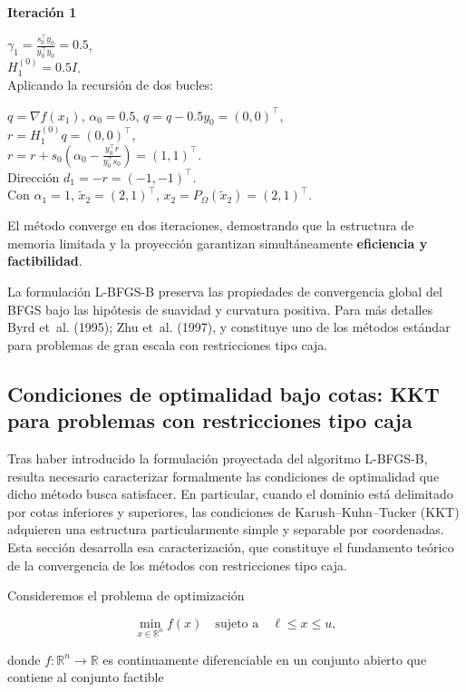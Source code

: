 \documentclass[
  spanish,
  us-letterpaper,
  DIV=11,
  numbers=noendperiod]{scrreprt}
\numberwithin{equation}{section}
\begin{document}
\textbf{Iteración 1}

\(\gamma_1=\tfrac{s_0^\top y_0}{y_0^\top y_0}=0.5\),\\
\(H_1^{(0)}=0.5I\).\\
Aplicando la recursión de dos bucles:

\(q=\nabla f(x_1)\), \(\alpha_0=0.5\), \(q=q-0.5y_0=(0,0)^\top\),\\
\(r=H_1^{(0)}q=(0,0)^\top\),\\
\(r=r+s_0(\alpha_0-\tfrac{y_0^\top r}{y_0^\top s_0})=(1,1)^\top\).\\
Dirección \(d_1=-r=(-1,-1)^\top\).\\
Con \(\alpha_1=1\), \(\tilde{x}_2=(2,1)^\top\),
\(x_2=P_\Omega(\tilde{x}_2)=(2,1)^\top\).

El método converge en dos iteraciones, demostrando que la estructura de
memoria limitada y la proyección garantizan simultáneamente
\textbf{eficiencia y factibilidad}.

La formulación L-BFGS-B preserva las propiedades de convergencia global
del BFGS bajo las hipótesis de suavidad y curvatura positiva. Para más
detalles Byrd et~al. (1995); Zhu et~al. (1997), y constituye uno de los
métodos estándar para problemas de gran escala con restricciones tipo
caja.

\subsection{Condiciones de optimalidad bajo cotas: KKT para problemas
con restricciones tipo
caja}\label{condiciones-de-optimalidad-bajo-cotas-kkt-para-problemas-con-restricciones-tipo-caja}

Tras haber introducido la formulación proyectada del algoritmo L-BFGS-B,
resulta necesario caracterizar formalmente las condiciones de
optimalidad que dicho método busca satisfacer. En particular, cuando el
dominio está delimitado por cotas inferiores y superiores, las
condiciones de Karush--Kuhn--Tucker (KKT) adquieren una estructura
particularmente simple y separable por coordenadas. Esta sección
desarrolla esa caracterización, que constituye el fundamento teórico de
la convergencia de los métodos con restricciones tipo caja.

Consideremos el problema de optimización

\[
\min_{x \in \mathbb{R}^n} f(x)
\quad \text{sujeto a} \quad
\ell \le x \le u,
\tag{3.26}
\]

donde \(f: \mathbb{R}^n \to \mathbb{R}\) es continuamente diferenciable
en un conjunto abierto que contiene al conjunto factible
\end{document}
